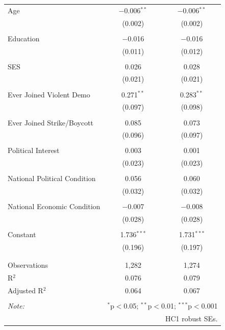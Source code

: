 \begin{table}[!htbp]
\begin{tabular}{@{\extracolsep{5pt}}lcc}
 Age & $-$0.006$^{**}$ & $-$0.006$^{**}$ \\ 
  & (0.002) & (0.002) \\ 
  & & \\ 
 Education & $-$0.016 & $-$0.016 \\ 
  & (0.011) & (0.012) \\ 
  & & \\ 
 SES & 0.026 & 0.028 \\ 
  & (0.021) & (0.021) \\ 
  & & \\ 
 Ever Joined Violent Demo & 0.271$^{**}$ & 0.283$^{**}$ \\ 
  & (0.097) & (0.098) \\ 
  & & \\ 
 Ever Joined Strike/Boycott & 0.085 & 0.073 \\ 
  & (0.096) & (0.097) \\ 
  & & \\ 
 Political Interest & 0.003 & 0.001 \\ 
  & (0.023) & (0.023) \\ 
  & & \\ 
 National Political Condition & 0.056 & 0.060 \\ 
  & (0.032) & (0.032) \\ 
  & & \\ 
 National Economic Condition & $-$0.007 & $-$0.008 \\ 
  & (0.028) & (0.028) \\ 
  & & \\ 
 Constant & 1.736$^{***}$ & 1.731$^{***}$ \\ 
  & (0.196) & (0.197) \\ 
  & & \\ 
\hline \\[-1.8ex] 
Observations & 1,282 & 1,274 \\ 
R$^{2}$ & 0.076 & 0.079 \\ 
Adjusted R$^{2}$ & 0.064 & 0.067 \\ 
\hline 
\hline \\[-1.8ex] 
\textit{Note:}  & \multicolumn{2}{r}{$^{*}$p$<$0.05; $^{**}$p$<$0.01; $^{***}$p$<$0.001} \\ 
 & \multicolumn{2}{r}{HC1 robust SEs.} \\ 
\end{tabular} 
\end{table} 
